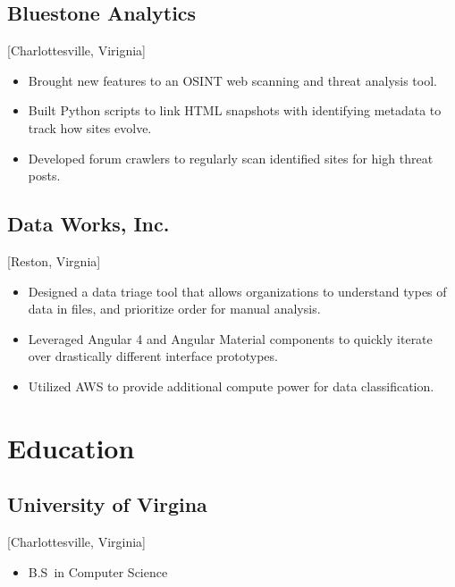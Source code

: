 \documentclass{mycv}
\begin{document}
\subsection{Bluestone Analytics}[Charlottesville, Virignia]
\begin{positions}
\end{positions}
\begin{itemize}
  \item Brought new features to an OSINT web scanning and threat analysis tool.
  \item Built Python scripts to link HTML snapshots with identifying metadata to track how sites evolve.
  \item Developed forum crawlers to regularly scan identified sites for high threat posts.
\end{itemize}

\subsection{Data Works, Inc.}[Reston, Virgnia]
\begin{positions}
\end{positions}
\begin{itemize}
  \item Designed a data triage tool that allows organizations to understand types of data in files, and prioritize order for manual analysis.
  \item Leveraged Angular 4 and Angular Material components to quickly iterate over drastically different interface prototypes.
  \item Utilized AWS to provide additional compute power for data classification.
\end{itemize}

\section{Education}

\subsection{University of Virgina}[Charlottesville, Virginia]
\vspace{-\parskip}%
\begin{itemize}[label={}]
  \item B.S\ in Computer Science 
\end{itemize}
\end{document}
